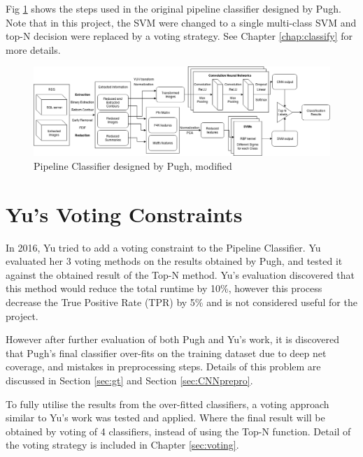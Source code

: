 \documentclass[bsc,logo,twoside,fullspacing,parskip]{infthesis}
\begin{document}
Fig \ref{fig:pipeline} shows the steps used in the original pipeline classifier designed by Pugh.
Note that in this project, the SVM were changed to a single multi-class SVM and top-N decision were replaced by a voting strategy.
See Chapter \ref{chap:classify} for more details.

\begin{figure}[!h]
    \centering
    \includegraphics[scale=0.35]{graph/Pipeline_Classifier.png}
    \caption{Pipeline Classifier designed by Pugh, modified}
    \label{fig:pipeline}
\end{figure}

\section{Yu's Voting Constraints}

In 2016, Yu\cite{Yu} tried to add a voting constraint to the Pipeline Classifier. 
Yu evaluated her 3 voting methods on the results obtained by Pugh, and tested it against the obtained result of the Top-N method. 
Yu's evaluation discovered that this method would reduce the total runtime by 10\%, however this process decrease the True Positive Rate (TPR) by 5\% and is not considered useful for the project. 

However after further evaluation of both Pugh and Yu's work, it is discovered that Pugh's final classifier over-fits on the training dataset due to deep net coverage, and mistakes in preprocessing steps. Details of this problem are discussed in Section \ref{sec:gt} and Section \ref{sec:CNNprepro}. 

To fully utilise the results from the over-fitted classifiers, a voting approach similar to Yu's work was tested and applied. 
Where the final result will be obtained by voting of 4 classifiers, instead of using the Top-N function.
Detail of the voting strategy is included in Chapter \ref{sec:voting}.
\end{document}
